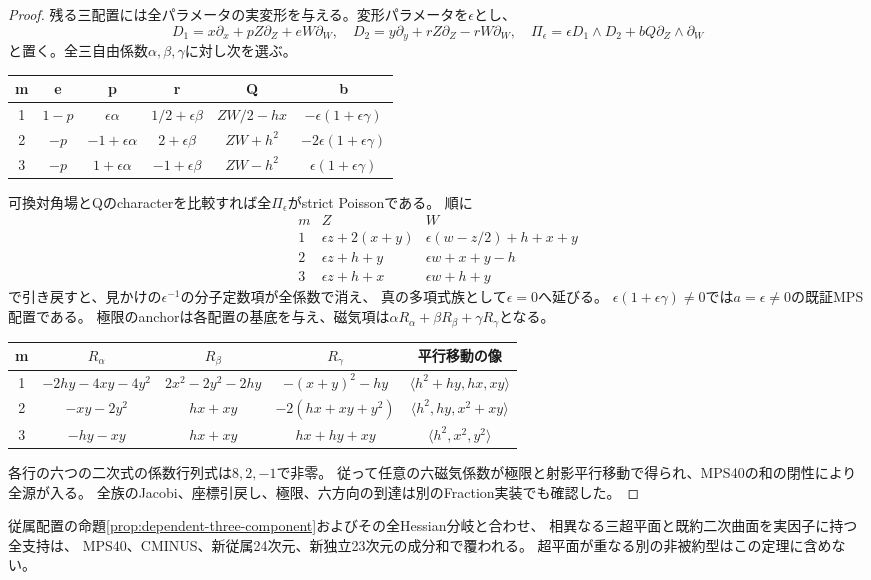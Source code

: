 \documentclass[a4paper,11pt]{ltjsarticle}
\theoremstyle{definition}
\begin{document}
\begin{proof}
残る三配置には全パラメータの実変形を与える。変形パラメータを$\epsilon$とし、
\[
 D_1=x\partial_x+pZ\partial_Z+eW\partial_W,\quad
 D_2=y\partial_y+rZ\partial_Z-rW\partial_W,\quad
 \Pi_\epsilon=\epsilon D_1\wedge D_2+bQ\partial_Z\wedge\partial_W
\]
と置く。全三自由係数$\alpha,\beta,\gamma$に対し次を選ぶ。
\begin{center}\small
\begin{tabular}{c|c|c|c|c|c}
m&e&p&r&Q&b\\\hline
1&$1-p$&$\epsilon\alpha$&$1/2+\epsilon\beta$&$ZW/2-hx$&$-\epsilon(1+\epsilon\gamma)$\\
2&$-p$&$-1+\epsilon\alpha$&$2+\epsilon\beta$&$ZW+h^2$&$-2\epsilon(1+\epsilon\gamma)$\\
3&$-p$&$1+\epsilon\alpha$&$-1+\epsilon\beta$&$ZW-h^2$&$\epsilon(1+\epsilon\gamma)$
\end{tabular}
\end{center}
可換対角場とQのcharacterを比較すれば全$\Pi_\epsilon$がstrict Poissonである。
順に
\[
\begin{array}{c|cc}
 m&Z&W\\\hline
 1&\epsilon z+2(x+y)&\epsilon(w-z/2)+h+x+y\\
 2&\epsilon z+h+y&\epsilon w+x+y-h\\
 3&\epsilon z+h+x&\epsilon w+h+y
\end{array}
\]
で引き戻すと、見かけの$\epsilon^{-1}$の分子定数項が全係数で消え、
真の多項式族として$\epsilon=0$へ延びる。
$\epsilon(1+\epsilon\gamma)\ne0$では$a=\epsilon\ne0$の既証MPS配置である。
極限のanchorは各配置の基底を与え、磁気項は$\alpha R_\alpha+\beta R_\beta+\gamma R_\gamma$となる。
\begin{center}\small
\begin{tabular}{c|c|c|c|c}
m&$R_\alpha$&$R_\beta$&$R_\gamma$&平行移動の像\\\hline
1&$-2hy-4xy-4y^2$&$2x^2-2y^2-2hy$&$-(x+y)^2-hy$&$\langle h^2+hy,hx,xy\rangle$\\
2&$-xy-2y^2$&$hx+xy$&$-2(hx+xy+y^2)$&$\langle h^2,hy,x^2+xy\rangle$\\
3&$-hy-xy$&$hx+xy$&$hx+hy+xy$&$\langle h^2,x^2,y^2\rangle$
\end{tabular}
\end{center}
各行の六つの二次式の係数行列式は$8,2,-1$で非零。
従って任意の六磁気係数が極限と射影平行移動で得られ、MPS40の和の閉性により全源が入る。
全族のJacobi、座標引戻し、極限、六方向の到達は別のFraction実装でも確認した。
\end{proof}

従属配置の命題\ref{prop:dependent-three-component}およびその全Hessian分岐と合わせ、
相異なる三超平面と既約二次曲面を実因子に持つ全支持は、
MPS40、CMINUS、新従属24次元、新独立23次元の成分和で覆われる。
超平面が重なる別の非被約型はこの定理に含めない。
\end{document}
